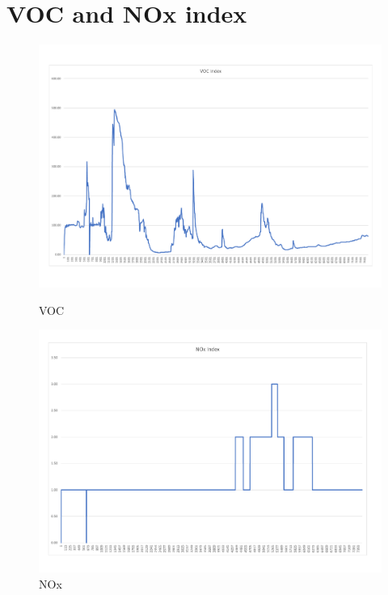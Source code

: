 \section{VOC and NOx index}
\begin{figure}[!htb]
	\includegraphics[width=\linewidth]{body/fig/VOC.pdf}
	\caption{VOC}\label{fig:voc}
	\endminipage\hfill
	\includegraphics[width=\linewidth]{body/fig/NOX.pdf}
	\caption{NOx}\label{fig:nox}
	\endminipage\hfill

\end{figure}

